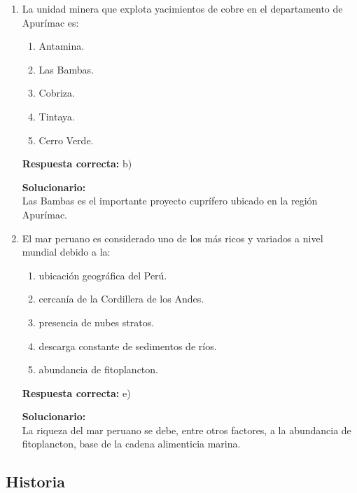 \begin{enumerate}
	
	\item La unidad minera que explota yacimientos de cobre en el departamento de Apurímac es:
	\begin{enumerate}[label=\alph*)]
		\item Antamina.
		\item Las Bambas.
		\item Cobriza.
		\item Tintaya.
		\item Cerro Verde.
	\end{enumerate}
	\textbf{Respuesta correcta:} b)
	
	\vspace{2mm}
	\textbf{Solucionario:}\\
	Las Bambas es el importante proyecto cuprífero ubicado en la región Apurímac.
	
	\vspace{6mm}
	
	\item El mar peruano es considerado uno de los más ricos y variados a nivel mundial debido a la:
	\begin{enumerate}[label=\alph*)]
		\item ubicación geográfica del Perú.
		\item cercanía de la Cordillera de los Andes.
		\item presencia de nubes stratos.
		\item descarga constante de sedimentos de ríos.
		\item abundancia de fitoplancton.
	\end{enumerate}
	\textbf{Respuesta correcta:} e)
	
	\vspace{2mm}
	\textbf{Solucionario:}\\
	La riqueza del mar peruano se debe, entre otros factores, a la abundancia de fitoplancton, base de la cadena alimenticia marina.
	
	\vspace{6mm}
	
\end{enumerate}

\subsection*{Historia}

